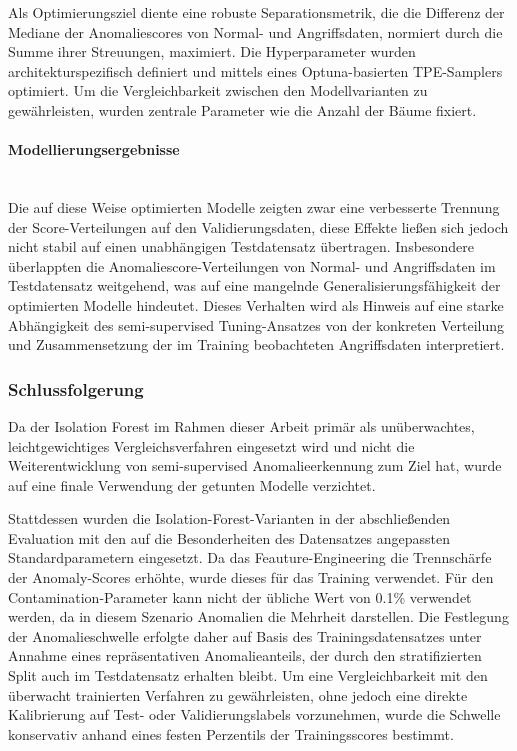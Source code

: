 \documentclass[12pt,oneside]{article}
\begin{document}
	Als Optimierungsziel diente eine robuste Separationsmetrik, die die Differenz der Mediane der Anomaliescores von Normal- und Angriffsdaten, normiert durch die Summe ihrer Streuungen, maximiert. Die Hyperparameter wurden architekturspezifisch definiert und mittels eines Optuna-basierten TPE-Samplers optimiert. Um die Vergleichbarkeit zwischen den Modellvarianten zu gewährleisten, wurden zentrale Parameter wie die Anzahl der Bäume fixiert.
	\paragraph{Modellierungsergebnisse} \mbox{}\\
	Die auf diese Weise optimierten Modelle zeigten zwar eine verbesserte Trennung der Score-Verteilungen auf den Validierungsdaten, diese Effekte ließen sich jedoch nicht stabil auf einen unabhängigen Testdatensatz übertragen. Insbesondere überlappten die Anomaliescore-Verteilungen von Normal- und Angriffsdaten im Testdatensatz weitgehend, was auf eine mangelnde Generalisierungsfähigkeit der optimierten Modelle hindeutet.
	Dieses Verhalten wird als Hinweis auf eine starke Abhängigkeit des semi-supervised Tuning-Ansatzes von der konkreten Verteilung und Zusammensetzung der im Training beobachteten Angriffsdaten interpretiert.
	\subsubsection{Schlussfolgerung}
	Da der Isolation Forest im Rahmen dieser Arbeit primär als unüberwachtes, leichtgewichtiges Vergleichsverfahren eingesetzt wird und nicht die Weiterentwicklung von semi-supervised Anomalieerkennung zum Ziel hat, wurde auf eine finale Verwendung der getunten Modelle verzichtet.

	Stattdessen wurden die Isolation-Forest-Varianten in der abschließenden Evaluation mit den auf die Besonderheiten des Datensatzes angepassten Standardparametern eingesetzt. Da das Feauture-Engineering die Trennschärfe der Anomaly-Scores erhöhte, wurde dieses für das Training verwendet. Für den Contamination-Parameter kann nicht der übliche Wert von 0.1\% verwendet werden, da in diesem Szenario Anomalien die Mehrheit darstellen. Die Festlegung der Anomalieschwelle erfolgte daher auf Basis des Trainingsdatensatzes unter Annahme eines repräsentativen Anomalieanteils, der durch den stratifizierten Split auch im Testdatensatz erhalten bleibt. Um eine Vergleichbarkeit mit den überwacht trainierten Verfahren zu gewährleisten, ohne jedoch eine direkte Kalibrierung auf Test- oder Validierungslabels vorzunehmen, wurde die Schwelle konservativ anhand eines festen Perzentils der Trainingsscores bestimmt.
\end{document}
